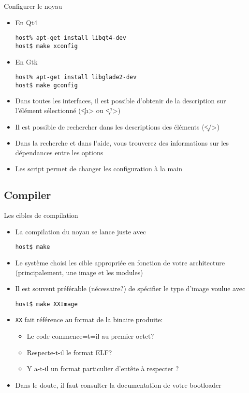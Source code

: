 \begin{frame}[fragile=singleslide]{Configurer le noyau}
\begin{itemize} 
 \item En Qt4
   \begin{lstlisting}
host% apt-get install libqt4-dev
host$ make xconfig
   \end{lstlisting} %
 \item En Gtk
   \begin{lstlisting}
host% apt-get install libglade2-dev
host$ make gconfig
   \end{lstlisting} %
 \item Dans  toutes les  interfaces, il est  possible d'obtenir  de la
   description sur l'élément sélectionné (\c{<h>} ou \c{<?>})
 \item  Il  est  possible  de  rechercher dans  les  descriptions  des
   éléments (\c{</>})
 \item  Dans   la  recherche  et  dans  l'aide,   vous  trouverez  des
   informations sur les dépendances entre les options
 \item   Les  script     permet  de   changer  les
   configuration à la main
 \end{itemize}
\end{frame}

\subsection{Compiler}

\begin{frame}[fragile=singleslide]{Les cibles de compilation}
  \begin{itemize} 
  \item  La compilation  du noyau  se lance  juste avec 
    \begin{lstlisting} 
host$ make
    \end{lstlisting} 
  \item Le  système choisi les  cible appropriée en fonction  de votre
    architecture (principalement, une image et les modules)
   \item Il est souvent  préférable (nécessaire?) de spécifier le type
     d'image voulue avec
    \begin{lstlisting}
host$ make XXImage
    \end{lstlisting}
  \item \texttt{XX} fait référence au format de la binaire produite:
    \begin{itemize}
    \item Le code commence=t=il au premier octet?
    \item Respecte-t-il le format ELF?
    \item Y a-t-il un format particulier d'entête à respecter ?
    \end{itemize}
  \item Dans  le doute,  il faut consulter  la documentation  de votre
    bootloader
  \end{itemize}
\end{frame} 

